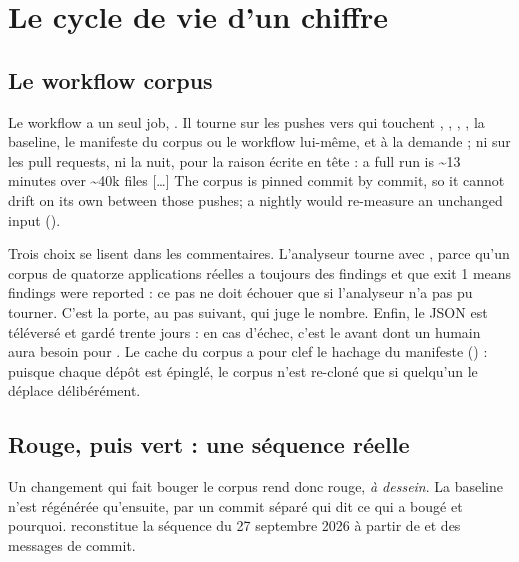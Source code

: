 \section{Le cycle de vie d'un chiffre}
\label{sec:tests-corpus-cycle}

\subsection{Le workflow corpus}

Le workflow  a un seul job, . Il tourne sur les pushes vers  qui touchent , , , , la baseline, le manifeste du corpus ou le workflow lui-même, et à la demande ; ni sur les pull requests, ni la nuit, pour la raison écrite en tête : \og a full run is \textasciitilde 13 minutes over \textasciitilde 40k files […] The corpus is pinned commit by commit, so it cannot drift on its own between those pushes; a nightly would re-measure an unchanged input\fg{} ().


Trois choix se lisent dans les commentaires. L'analyseur tourne avec , parce qu'un corpus de quatorze applications réelles a toujours des findings et que \og exit 1 means findings were reported\fg{} : ce pas ne doit échouer que si l'analyseur n'a pas pu tourner. C'est la porte, au pas suivant, qui juge le nombre. Enfin, le JSON est téléversé  et gardé trente jours : en cas d'échec, c'est le \og avant\fg{} dont un humain aura besoin pour . Le cache du corpus a pour clef le hachage du manifeste () : puisque chaque dépôt est épinglé, le corpus n'est re-cloné que si quelqu'un le déplace délibérément.

\subsection{Rouge, puis vert : une séquence réelle}

Un changement qui fait bouger le corpus rend donc  rouge, \emph{à dessein}. La baseline n'est régénérée qu'ensuite, par un commit séparé qui dit ce qui a bougé et pourquoi.  reconstitue la séquence du 27 septembre 2026 à partir de  et des messages de commit.

